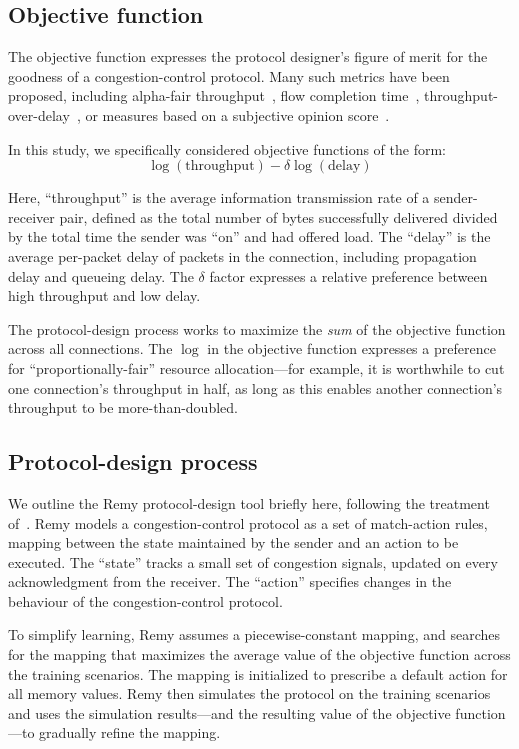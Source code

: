 \subsection{Objective function}
\label{ss:objective}
The objective function expresses the protocol designer's figure of
merit for the goodness of a congestion-control protocol. Many such
metrics have been proposed, including alpha-fair
throughput~\cite{Srikant}, flow completion time~\cite{dctcp},
throughput-over-delay~\cite{codelID}, or measures based on a
subjective opinion score~\cite{MOSCC}.

In this study, we specifically considered objective functions of the
form:
\begin{equation}
\log\left( \textrm{throughput} \right)  - \delta \log\left( \textrm{delay} \right)
\end{equation}

Here, ``throughput'' is the average information transmission rate of a
sender-receiver pair, defined as the total number of bytes
successfully delivered divided by the total time the sender was ``on''
and had offered load. The ``delay'' is the average per-packet delay of
packets in the connection, including propagation delay and queueing
delay. The $\delta$ factor expresses a relative preference between high throughput and low delay.

The protocol-design process works to maximize the \emph{sum} of the
objective function across all connections. The $\log$ in the objective
function expresses a preference for ``proportionally-fair'' resource
allocation---for example, it is worthwhile to cut one connection's
throughput in half, as long as this enables another connection's
throughput to be more-than-doubled.

\subsection{Protocol-design process}
\label{ss:learning}
We outline the Remy protocol-design tool briefly here, following the
treatment of~\cite{remy}. Remy models a congestion-control protocol as
a set of match-action rules, mapping between the state maintained by
the sender and an action to be executed. The ``state'' tracks a small
set of congestion signals, updated on every acknowledgment from the
receiver. The ``action'' specifies changes in the behaviour of the
congestion-control protocol.

To simplify learning, Remy assumes a piecewise-constant mapping, and
searches for the mapping that maximizes the average value of the
objective function across the training scenarios.  The mapping is
initialized to prescribe a default action for all memory values. Remy
then simulates the protocol on the training scenarios and uses the
simulation results---and the resulting value of the objective
function---to gradually refine the mapping.

